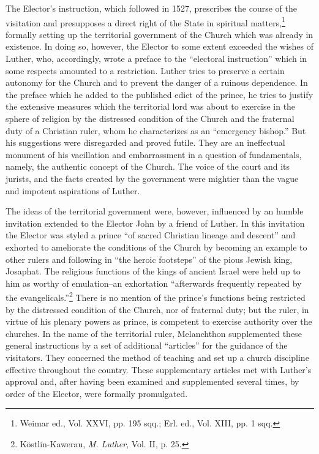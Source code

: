 The Elector’s instruction, which followed in 1527, prescribes the
course of the visitation and presupposes a direct right of the State
in spiritual matters,\footnote{Weimar ed., Vol. XXVI, pp. 195 sqq.; Erl. ed., Vol. XIII, pp. 1 sqq.}
formally setting up the territorial government
of the Church which was already in existence. In doing so, however,
the Elector to some extent exceeded the wishes of Luther, who, accordingly,
wrote a preface to the “electoral instruction” which in
some respects amounted to a restriction. Luther tries to preserve
a certain autonomy for the Church and to prevent the danger of a
ruinous dependence. In the preface which he added to the published
edict of the prince, he tries to justify the extensive measures which
the territorial lord was about to exercise in the sphere of religion
by the distressed condition of the Church and the fraternal duty
of a Christian ruler, whom he characterizes as an “emergency
bishop.” But his suggestions were disregarded and proved futile.
They are an ineffectual monument of his vacillation and embarrassment
in a question of fundamentals, namely, the authentic concept
of the Church. The voice of the court and its jurists, and the
facts created by the government were mightier than the vague and
impotent aspirations of Luther.

The ideas of the territorial government were, however, influenced
by an humble invitation extended to the Elector John by a friend
of Luther. In this invitation the Elector was styled a prince “of sacred
Christian lineage and descent” and exhorted to ameliorate the conditions
of the Church by becoming an example to other rulers and
following in “the heroic footsteps” of the pious Jewish king, Josaphat.
The religious functions of the kings of ancient Israel were held
up to him as worthy of emulation--an exhortation “afterwards frequently
repeated by the evangelicals.”\footnote{Köstlin-Kawerau, \textit{M. Luther}, Vol. II, p. 25.}
 There is no mention of the
prince’s functions being restricted by the distressed condition of the
Church, nor of fraternal duty; but the ruler, in virtue of his plenary
powers as prince, is competent to exercise authority over the churches.
In the name of the territorial ruler, Melanchthon supplemented
these general instructions by a set of additional “articles” for the
guidance of the visitators. They concerned the method of teaching
and set up a church discipline effective throughout the country. These
supplementary articles met with Luther’s approval and, after having
been examined and supplemented several times, by order of the Elector,
were formally promulgated.

